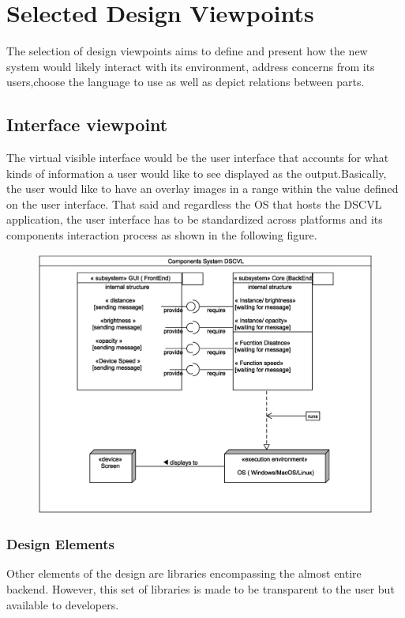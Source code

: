 \documentclass[10pt,draftclsnofoot,onecolumn,journal,compsoc]{IEEEtran}
\begin{document}
\section{Selected Design Viewpoints}
The selection of design viewpoints aims to define and present how the new system  would likely interact with its environment, address concerns from its users,choose the language to use as well as depict relations between parts.  
	\subsection{Interface viewpoint}
The virtual visible interface would be the user interface that accounts for what kinds of information a user would like to see displayed as the output.Basically, the user would like to have an overlay images in a range within the value defined on the user interface.  
That said and regardless the OS that hosts the DSCVL application, the user interface has to be standardized across platforms and its components interaction process as shown in the following figure.
\\[2ex]
    	\begin{figure}[ht]
    	 \centering \includegraphics[width=4.5in,natwidth=4000,natheight=200]{images/components.eps}
    	\end{figure}

		
		\subsubsection{Design Elements}
Other elements of the design are libraries encompassing the almost entire backend. However, this set of libraries is made to be transparent to the user but available to developers. 
\end{document}
